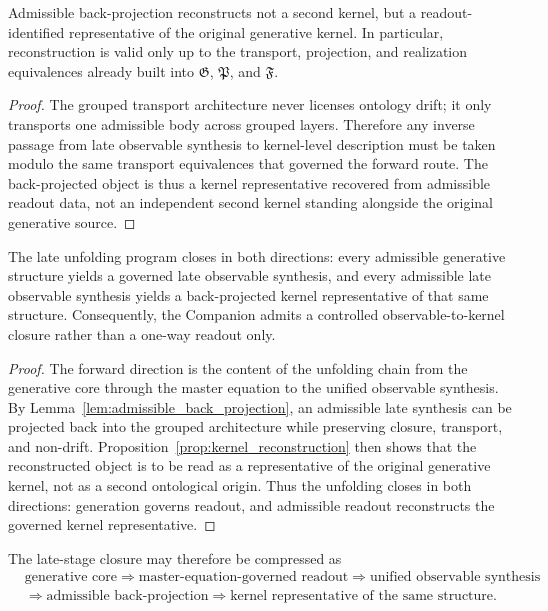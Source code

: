 \begin{proposition}\label{prop:kernel_reconstruction}
Admissible back-projection reconstructs not a second kernel, but a readout-identified representative of the original generative kernel. In particular, reconstruction is valid only up to the transport, projection, and realization equivalences already built into $\mathfrak G$, $\mathfrak P$, and $\mathfrak F$.
\end{proposition}
\begin{proof}
The grouped transport architecture never licenses ontology drift; it only transports one admissible body across grouped layers. Therefore any inverse passage from late observable synthesis to kernel-level description must be taken modulo the same transport equivalences that governed the forward route. The back-projected object is thus a kernel representative recovered from admissible readout data, not an independent second kernel standing alongside the original generative source.
\end{proof}

\begin{theorem}\label{thm:observable_to_kernel_closure}
The late unfolding program closes in both directions: every admissible generative structure yields a governed late observable synthesis, and every admissible late observable synthesis yields a back-projected kernel representative of that same structure. Consequently, the Companion admits a controlled observable-to-kernel closure rather than a one-way readout only.
\end{theorem}
\begin{proof}
The forward direction is the content of the unfolding chain from the generative core through the master equation to the unified observable synthesis. By Lemma~\ref{lem:admissible_back_projection}, an admissible late synthesis can be projected back into the grouped architecture while preserving closure, transport, and non-drift. Proposition~\ref{prop:kernel_reconstruction} then shows that the reconstructed object is to be read as a representative of the original generative kernel, not as a second ontological origin. Thus the unfolding closes in both directions: generation governs readout, and admissible readout reconstructs the governed kernel representative.
\end{proof}

\begin{corollary}\label{cor:bidirectional_closure_chain}
The late-stage closure may therefore be compressed as
\[
\begin{aligned}
&\text{generative core}
\Longrightarrow \text{master-equation-governed readout}
\Longrightarrow \text{unified observable synthesis}\\
&\Longrightarrow \text{admissible back-projection}
\Longrightarrow \text{kernel representative of the same structure.}
\end{aligned}
\]
\end{corollary}


